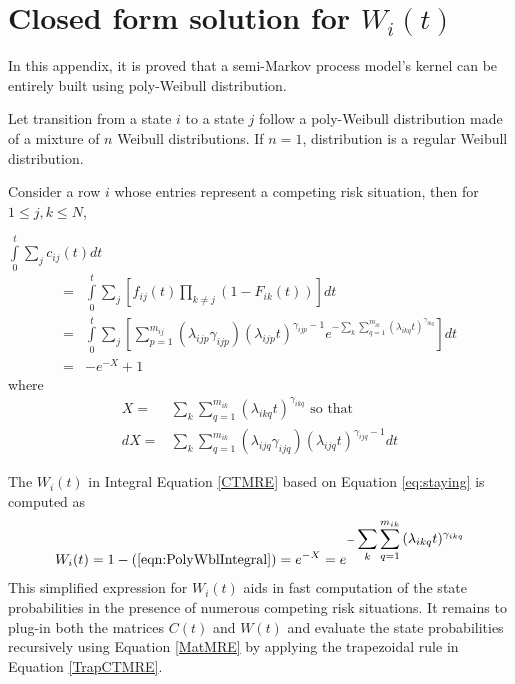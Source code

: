 \appendix



\section{Closed form solution for $W_i(t)$}

In this appendix, it is proved that a semi-Markov process model's kernel can be
entirely built using poly-Weibull distribution.

Let transition from a state $i$ to a state $j$ follow a poly-Weibull distribution
made of a mixture of $n$ Weibull distributions. If $n=1$, distribution
is a regular Weibull distribution. 


Consider a row $i$ whose entries represent  a competing risk situation, then for $1 \le j,k \le N$,


$\int\limits_0^t {\displaystyle\sum\limits_j {c_{ij} (t)dt} }$
\begin{align}
=& \int\limits_0^t{\sum\limits_j {[f_{ij}(t)\prod\limits_{k\ne j}{(1-F_{ik}(t))}]} dt} \nonumber \\
=&\int\limits_0^t {\sum\limits_j{[ \displaystyle\sum_{p=1}^{m_{ij}}(\lambda_{ijp} \gamma_{ijp}) (\lambda_{ijp}t)^{\gamma_{ijp}-1} e^{-\displaystyle\sum\limits_{k}\sum\limits_{q=1}^{m_{ik}}{(\lambda_{ikq}t)^{\gamma_{ikq}}}}   ]} dt} \nonumber \\
=&-e^{-X} + 1
\label{eqn:PolyWblIntegral}
\end{align}
where
\begin{align}
X =& \sum_{k}\sum_{q=1}^{m_{ik}}{(\lambda_{ikq}t)^{\gamma_{ikq}}}  \text{ so that} \nonumber \\
dX =& \sum_k\displaystyle\sum_{q=1}^{m_{ik}}(\lambda_{ijq} \gamma_{ijq}) (\lambda_{ijq}t)^{\gamma_{ijq}-1}dt \nonumber
\end{align}

The $W_i(t)$ in Integral Equation \ref{CTMRE} based on Equation \ref{eq:staying} is computed as
\begin{align}
W_i(t) = 1-(\ref{eqn:PolyWblIntegral})  = e^{-X} = e^{-\displaystyle\sum_{k}\sum_{q=1}^{m_{ik}}{(\lambda_{ikq}t)^{\gamma_{ikq}}}}
\label{eq:PolyWblStaying}
\end{align}
This simplified expression for $W_i(t)$ aids in fast computation of the state probabilities in the presence of
numerous competing risk situations.
It remains to plug-in both the matrices $C(t)$ and $W(t)$ and evaluate the state probabilities
recursively using Equation \ref{MatMRE} by applying the trapezoidal rule in Equation \ref{TrapCTMRE}.




